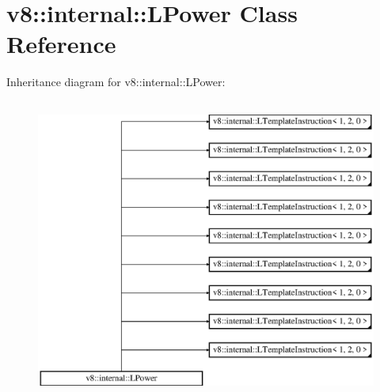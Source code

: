 \hypertarget{classv8_1_1internal_1_1_l_power}{}\section{v8\+:\+:internal\+:\+:L\+Power Class Reference}
\label{classv8_1_1internal_1_1_l_power}
Inheritance diagram for v8\+:\+:internal\+:\+:L\+Power\+:\begin{figure}[H]
\begin{center}
\leavevmode
\includegraphics[height=10.000000cm]{classv8_1_1internal_1_1_l_power}
\end{center}
\end{figure}
